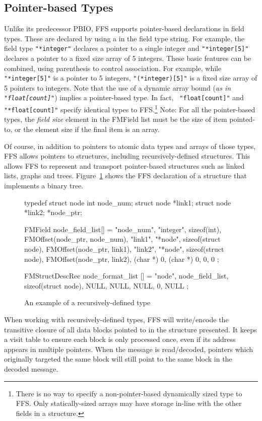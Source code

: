 \subsection{Pointer-based Types}
Unlike its predecessor PBIO, FFS supports pointer-based declarations in
field types.  These are declared by using a {\tt *} in the field type
string.  For example, the field type {\tt "*integer"} declares a pointer to
a single integer and {\tt "*integer[5]"} declares a pointer to a fixed size
array of 5 integers.  These basic features can be combined, using
parenthesis to control association.  For example, while {\tt "*integer[5]"}
is a pointer to 5 integers, {\tt "(*integer)[5]"} is a fixed size array of 5
pointers to integers.  Note that the use of a dynamic array bound ({\it as
  in {\tt "float[count]"}}) implies a pointer-based type.  In fact, {\tt
  "float[count]"} and {\tt "*float[count]"} specify identical types to
FFS.\footnote{There is no way to specify a non-pointer-based dynamically
  sized type to FFS.  Only statically-sized arrays may have storage in-line
  with the other fields in a structure.}  Note:  For all the pointer-based
types, the {\em field size} element in the FMField list must be the size of
item pointed-to, or the element size if the final item is an array.

Of course, in addition to pointers to atomic data types and arrays of those
types, FFS allows pointers to structures, including recursively-defined
structures.  This allows FFS to represent and transport pointer-based
structures such as linked lists, graphs and trees.
Figure~\ref{fig:recursive} shows the FFS declaration of a structure that
implements a binary tree.
\begin{figure}
\begin{WrapCode}
typedef struct node {
    int node_num;
    struct node *link1;
    struct node *link2;
} *node_ptr;

FMField node_field_list[] = 
{
    {"node_num", "integer", sizeof(int), FMOffset(node_ptr, node_num)},
    {"link1", "*node", sizeof(struct node), FMOffset(node_ptr, link1)},
    {"link2", "*node", sizeof(struct node), FMOffset(node_ptr, link2)},
    {(char *) 0, (char *) 0, 0, 0}
};

FMStructDescRec node_format_list [] = {
    {"node", node_field_list, sizeof(struct node), NULL},
    {NULL, NULL, 0, NULL}
};
\end{WrapCode}
\caption{An example of a recursively-defined type\label{fig:recursive}}
\end{figure}
When working with recursively-defined types, FFS will write/encode the
transitive closure of all data blocks pointed to in the structure
presented.  It keeps a visit table to ensure each block is only processed
once, even if its address appears in multiple pointers.  When the message is
read/decoded, pointers which originally targeted the same block will still
point to the same block in the decoded message.

